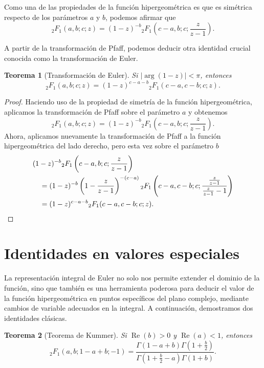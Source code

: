 \documentclass[12pt,a4paper]{book}
\renewcommand{\Re}{\operatorname{Re}}
\newtheorem{theorem}{Teorema}
\begin{document}
Como una de las propiedades de la función hipergeométrica es que es simétrica respecto de los parámetros $a$ y $b$, podemos afirmar que 
\[
    {}_{2}F_{1}(a, b; c; z) = (1-z)^{-b} {}_{2}F_{1}\left(c-a, b; c; \frac{z}{z-1}\right).
\]

A partir de la transformación de Pfaff, podemos deducir otra identidad crucial conocida como la transformación de Euler.

\begin{theorem}[Transformación de Euler]
\label{teo:euler}
Si $|\arg(1-z)|<\pi$, entonces
\[
{}_{2}F_{1}(a, b; c; z) = (1-z)^{c-a-b} {}_{2}F_{1}(c-a, c-b; c; z).
\]
\end{theorem}

\begin{proof}
Haciendo uso de la propiedad de simetría de la función hipergeométrica, aplicamos la transformación de Pfaff sobre el parámetro $a$ y obtenemos
\begin{equation*}
{}_{2}F_{1}(a, b; c; z) = (1-z)^{-b} {}_{2}F_{1}\left(c-a, b; c; \frac{z}{z-1}\right).
\end{equation*}
Ahora, aplicamos nuevamente la transformación de Pfaff a la función hipergeométrica del lado derecho, pero esta vez sobre el parámetro $b$
\begin{align*}
    &(1-z)^{-b}{}_{2}F_{1}\left(c-a, b; c; \frac{z}{z-1}\right) \\ 
    &\quad = (1-z)^{-b}\left(1-\frac{z}{z-1}\right)^{-(c-a)} {}_{2}F_{1}\left(c-a, c-b; c; \frac{\frac{z}{z-1}}{\frac{z}{z-1}-1}\right) \\ 
    &\quad = (1-z)^{c-a-b} {}_{2}F_{1}(c-a, c-b; c; z).
    \qedhere
\end{align*}
\end{proof}

\section{Identidades en valores especiales}

La representación integral de Euler no solo nos permite extender el dominio de la función, sino que también es una herramienta poderosa para deducir el valor de la función hipergeométrica en puntos específicos del plano complejo, mediante cambios de variable adecuados en la integral. A continuación, demostramos dos identidades clásicas.

\begin{theorem}[Teorema de Kummer]
\label{teo:kummer_z_minus_1}
Si $\Re(b) > 0$ y $\Re(a)< 1$, entonces
\[
{}_{2}F_{1}(a, b; 1-a+b; -1) = \frac{\Gamma(1-a+b) \Gamma(1+\frac{b}{2})}{\Gamma(1+\frac{b}{2}-a) \Gamma(1+b)}.
\]
\end{theorem}
\end{document}
